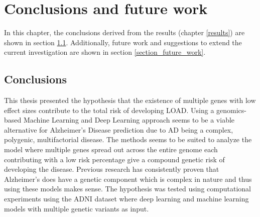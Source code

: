 \chapter{Conclusions and future work} \label{conclusions}

In this chapter, the conclusions derived from the results 
(chapter \ref{results}) are shown in section \ref{section_conclusions}. 
Additionally, future work and suggestions to extend the current investigation are shown in 
section \ref{section_future_work}. 

\section{Conclusions} \label{section_conclusions}



This thesis presented the hypothesis that the existence of multiple genes with low effect sizes contribute to the total risk of developing LOAD. Using a genomics-based Machine Learning and Deep Learning approach seems to be a viable alternative for Alzheimer's Disease prediction due to AD being a complex, polygenic, multifactorial disease. The methods seems to be suited to analyze the model where multiple genes spread out across the entire genome each contributing with a low risk percentage give a compound genetic risk of developing the disease. Previous research has consistently proven that Alzheimer's does have a genetic component which is complex in nature and thus using these models makes sense. The hypothesis was tested using computational experiments using the ADNI dataset where deep learning and machine learning models with multiple genetic variants as input.

